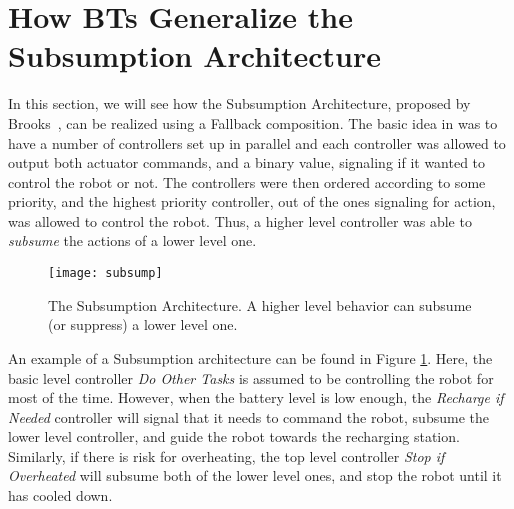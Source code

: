 \section{How BTs Generalize the Subsumption Architecture}
\label{btsvsothers:sec:analogySA}
In this section, we will see how the
 Subsumption Architecture, proposed by Brooks~\cite{brooks1986robust}, can be realized using a Fallback composition.
The basic idea in  \cite{brooks1986robust} was to have a number of controllers set up in parallel and each controller was allowed to output both actuator commands, and a binary value, signaling if it wanted to control the robot or not. The controllers were then ordered according to some priority, and the highest priority controller, out of the ones signaling for action, was allowed to control the robot. Thus, a higher level controller was able to \emph{subsume} the actions of a lower level one.

\begin{figure}[htbp]
\begin{center}
\texttt{[image: subsump]}
\caption{The Subsumption Architecture. A higher level behavior can subsume (or suppress) a lower level one. }
\label{btsvsothers:fig:subsump}
\end{center}
\end{figure}

An example of a Subsumption architecture can be found in Figure  \ref{btsvsothers:fig:subsump}. Here, the basic level controller \emph{Do Other Tasks} is assumed to be controlling the robot for most of the time. However, when the battery level is low enough, the \emph{Recharge if Needed} controller will signal that it needs to command the robot, subsume the lower level controller, and guide the robot towards the recharging station. Similarly, if there is risk for overheating, the top level controller \emph{Stop if Overheated} will subsume both of the lower level ones, and stop the robot until it has cooled down.




